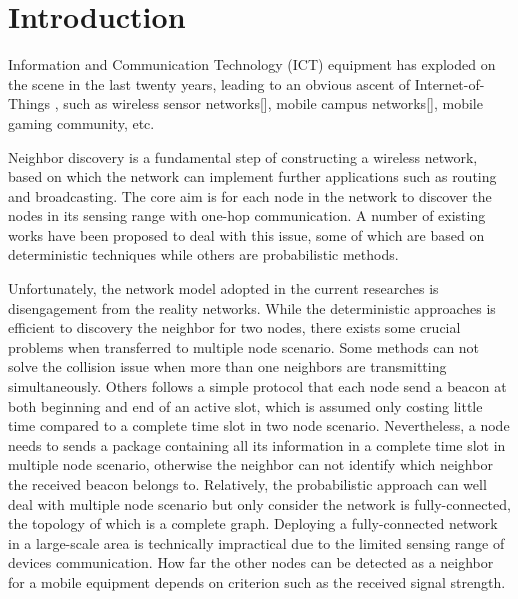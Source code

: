 \section{Introduction}



Information and Communication Technology (ICT) equipment \cite{zeadally2012energy} has exploded 
on the scene in the last twenty years, leading to an obvious ascent of Internet-of-Things \cite{atzori2010internet},
such as wireless sensor networks[], mobile campus networks[], mobile gaming community, etc.


Neighbor discovery is a fundamental step of constructing a wireless network, based on 
which the network can implement further applications such as routing and broadcasting.
The core aim is for each node in the network to discover the nodes in its sensing range 
with one-hop communication. A number of existing works \cite{dutta2008practical,kandhalu2010u,
bakht2012searchlight,sun2014hello,chen2015heterogeneous,
wang2015blinddate,qiu2016talk,mcglynn2001birthday,
vasudevan2009neighbor,you2011aloha,song2014probabilistic} have been proposed 
to deal with this issue, some of which are based on deterministic techniques while others
are probabilistic methods.


Unfortunately, the network model adopted in the current researches is disengagement from the reality networks.
While the deterministic approaches is efficient to discovery the neighbor
for two nodes, there exists some crucial problems when transferred to multiple node scenario.
Some methods can not solve the collision issue when more than one neighbors are transmitting simultaneously. 
Others follows a simple protocol that each node send a beacon at both beginning and end of an active slot, 
which is assumed only costing little time compared to a complete time slot in two node scenario. Nevertheless,
a node needs to sends a package containing all its information in a complete time slot in multiple node scenario,
otherwise the neighbor can not identify which neighbor the received beacon belongs to.
Relatively, the probabilistic approach can well deal with multiple node scenario but only consider
the network is fully-connected, the topology of which is a complete graph. 
Deploying a fully-connected network in a large-scale area is technically impractical 
due to the limited sensing range of devices communication.
How far the other nodes can be detected as a neighbor for a mobile equipment  
depends on criterion such as the received signal strength.

